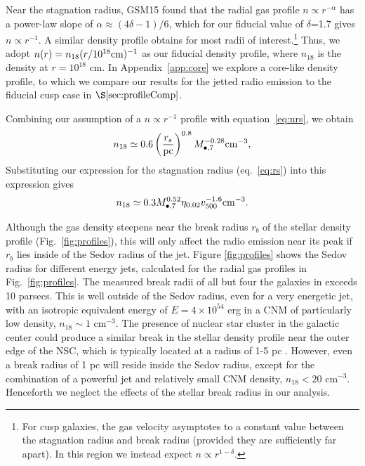 \documentclass[usenatbib,fleqn]{mnras}
\newcommand{\Mbh}[1][]{M_{\bullet#1}}
\begin{document}
Near the stagnation radius, GSM15 found that the radial gas profile $n \propto r^{-\alpha}$ has a power-law slope of $\alpha \approx (4\delta-1)/6$, which for our fiducial value of $\delta$=1.7 gives $n \propto r^{-1}$.  A similar density profile obtains for most radii of interest.\footnote{For cusp galaxies, the gas velocity asymptotes to a constant value between the stagnation radius and break radius (provided they are
  sufficiently far apart). In this region we instead expect $n\propto r^{1-\delta}$.}  Thus, we adopt $n(r)= n_{18} (r/10^{18} {\rm cm})^{-1}$ as our fiducial density profile, where $n_{18}$ is the density at $r = 10^{18}$ cm.  In Appendix~\ref{app:core} we explore a core-like density profile, to which we compare our results for the jetted radio emission to the fiducial cusp case in $\S\ref{sec:profileComp}$.

Combining our assumption of a $n\propto r^{-1}$ profile with equation~\eqref{eq:nrs}, we
obtain
\begin{equation}
  n_{18}\simeq 0.6 \left(\frac{r_s}{\rm pc}\right)^{0.8}
  \Mbh[,7]^{-0.28} {\rm cm^{-3}},
  \label{eq:n18}
\end{equation}
Substituting our expression for the stagnation radius (eq.~\ref{eq:rs}) into this expression gives
\begin{equation}
n_{18}\simeq 0.3 \Mbh[,7]^{0.52} \eta_{0.02} v_{500}^{-1.6} {\rm
  cm^{-3}}.
\label{eq:n182}
\end{equation} 

Although the gas density steepens near the break radius $r_b$ of the stellar density profile (Fig.~\ref{fig:profiles}), this will only affect the radio emission near its peak if $r_b$ lies inside of the Sedov radius of the jet.  Figure \ref{fig:profiles} shows the Sedov radius for different energy jets, calculated for the radial gas profiles in Fig.~\ref{fig:profiles}.  The measured break radii of all but four the galaxies in \citet{Lauer+2007} exceeds 10 parsecs.  This is well outside of the Sedov radius, even for a very energetic jet, with an isotropic equivalent energy of $E=4\times 10^{54}$ erg in a CNM of particularly low density, $n_{18} \sim 1$ cm$^{-3}$.  The presence of nuclear star cluster in the galactic center could produce a similar break in the stellar density profile near the outer edge of the NSC, which is typically located at a radius of 1-5 pc \citep{Georgiev+2014}.   However, even a break radius of 1 pc will reside inside the Sedov radius, except for  the combination of a powerful jet and relatively small CNM density, $n_{18}<20$ cm$^{-3}$.  Henceforth we neglect the effects of the stellar break radius in our analysis.
\end{document}
